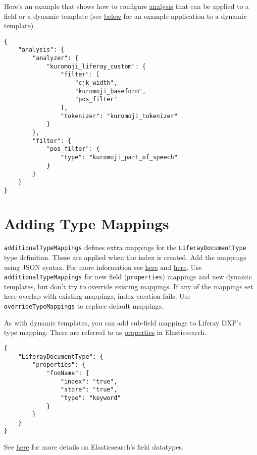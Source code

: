 Here's an example that shows how to configure
\href{https://www.elastic.co/guide/en/elasticsearch/reference/7.x/index-modules-analysis.html}{analysis}
that can be applied to a field or a dynamic template (see
\hyperref[overriding-type-mappings]{below} for an example application to
a dynamic template).

\begin{verbatim}
{  
    "analysis": {
        "analyzer": {
            "kuromoji_liferay_custom": {
                "filter": [
                    "cjk_width",
                    "kuromoji_baseform",
                    "pos_filter"
                ],
                "tokenizer": "kuromoji_tokenizer"
            }
        },
        "filter": {
            "pos_filter": {
                "type": "kuromoji_part_of_speech"
            }
        }
    }
}
\end{verbatim}

\section{Adding Type Mappings}\label{adding-type-mappings}

\texttt{additionalTypeMappings} defines extra mappings for the
\texttt{LiferayDocumentType} type definition. These are applied when the
index is created. Add the mappings using JSON syntax. For more
information see
\href{https://www.elastic.co/guide/en/elasticsearch/reference/7.x/mapping.html}{here}
and
\href{https://www.elastic.co/guide/en/elasticsearch/reference/7.x/indices-put-mapping.html}{here}.
Use \texttt{additionalTypeMappings} for new field (\texttt{properties})
mappings and new dynamic templates, but don't try to override existing
mappings. If any of the mappings set here overlap with existing
mappings, index creation fails. Use \texttt{overrideTypeMappings} to
replace default mappings.

As with dynamic templates, you can add sub-field mappings to Liferay
DXP's type mapping. These are referred to as
\href{https://www.elastic.co/guide/en/elasticsearch/reference/7.x/properties.html}{properties}
in Elasticsearch.

\begin{verbatim}
{ 
    "LiferayDocumentType": {  
        "properties": {   
            "fooName": {
                "index": "true",
                "store": "true",
                "type": "keyword"
            }
        }   
    }
}
\end{verbatim}

See
\href{https://www.elastic.co/guide/en/elasticsearch/reference/7.x/mapping-types.html}{here}
for more details on Elasticsearch's field datatypes.

